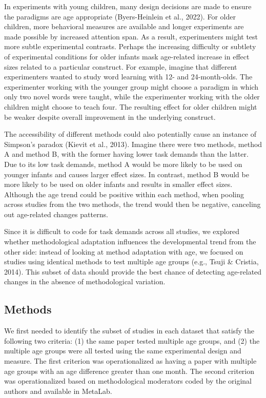 \documentclass[
  man]{apa6}
\begin{document}
In experiments with young children, many design decisions are made to ensure the paradigms are age appropriate (Byers-Heinlein et al., 2022). For older children, more behavioral measures are available and longer experiments are made possible by increased attention span. As a result, experimenters might test more subtle experimental contrasts. Perhaps the increasing difficulty or subtlety of experimental conditions for older infants mask age-related increase in effect sizes related to a particular construct. For example, imagine that different experimenters wanted to study word learning with 12- and 24-month-olds. The experimenter working with the younger group might choose a paradigm in which only two novel words were taught, while the experimenter working with the older children might choose to teach four. The resulting effect for older children might be weaker despite overall improvement in the underlying construct.

The accessibility of different methods could also potentially cause an instance of Simpson's paradox (Kievit et al., 2013). Imagine there were two methods, method A and method B, with the former having lower task demands than the latter. Due to its low task demands, method A would be more likely to be used on younger infants and causes larger effect sizes. In contrast, method B would be more likely to be used on older infants and results in smaller effect sizes. Although the age trend could be positive within each method, when pooling across studies from the two methods, the trend would then be negative, canceling out age-related changes patterns.

Since it is difficult to code for task demands across all studies, we explored whether methodological adaptation influences the developmental trend from the other side: instead of looking at method adaptation with age, we focused on studies using identical methods to test multiple age groups (e.g., Tsuji \& Cristia, 2014). This subset of data should provide the best chance of detecting age-related changes in the absence of methodological variation.

\hypertarget{methods-2}{%
\subsection{Methods}\label{methods-2}}

We first needed to identify the subset of studies in each dataset that satisfy the following two criteria: (1) the same paper tested multiple age groups, and (2) the multiple age groups were all tested using the same experimental design and measure. The first criterion was operationalized as having a paper with multiple age groups with an age difference greater than one month. The second criterion was operationalized based on methodological moderators coded by the original authors and available in MetaLab.
\end{document}
